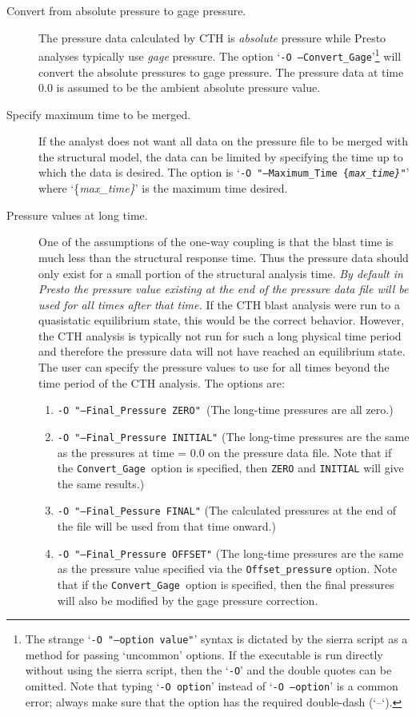 \documentclass[11pt,twoside]{article}
\newcommand{\cmd}[1]
   {\mbox{\tt #1}\null}
\newcommand{\param}[1]
   {\mbox{\{\em #1\}}\null}
\begin{document}
\begin{description}
\item [Convert from absolute pressure to gage pressure.]  The pressure data
calculated by CTH is \textit{absolute} pressure while Presto analyses
typically use \textit{gage} pressure.  The option `\cmd{{}-O
{--}Convert\_Gage}'\footnote{ The strange `\cmd{{-}O "{--}option
value"}' syntax is dictated by the sierra script as a method for
passing `uncommon' options.  If the executable is run directly without
using the sierra script, then the `\cmd{{-}O}' and the double quotes
can be omitted.  Note that typing `\cmd{{}-O option}' instead of
`\cmd{{}-O {--}option}' is a common error; always make sure that the
option has the required double-dash (`{}--`).} will convert the
absolute pressures to gage pressure.  The pressure data at time 0.0 is
assumed to be the ambient absolute pressure value.
\item [Specify maximum time to be merged.]  If the analyst does not want all
data on the pressure file to be merged with the structural model, the
data can be limited by specifying the time up to which the data is
desired.  The option is `\cmd{{-}O "{--}Maximum\_Time
\param{max\_time}"}' where `\param{max\_time}' is the maximum time
desired.
\item [Pressure values at long time.]  One of the assumptions of the one{}-way
coupling is that the blast time is much less than the structural
response time.  Thus the pressure data should only exist for a small
portion of the structural analysis time.  \textit{By default in Presto
the pressure value existing at the end of the pressure data file will
be used for all times after that time. } If the CTH blast analysis
were run to a quasistatic equilibrium state, this would be the correct
behavior.  However, the CTH analysis is typically not run for such a
long physical time period and therefore the pressure data will not have
reached an equilibrium state.  The user can specify the pressure
values to use for all times beyond the time period of the CTH analysis.
The options are:

\begin{enumerate}
\item \cmd{{-}O "{--}Final\_Pressure ZERO"  }(The long{}-time
pressures are all zero.)
\item \cmd{{-}O "{--}Final\_Pressure INITIAL"}  (The long{}-time
pressures are the same as the pressures at time = 0.0 on the pressure
data file.  Note that if the \cmd{Convert\_Gage }option is
specified, then \cmd{ZERO} and \cmd{INITIAL} will give the same
results.)
\item \cmd{{-}O "{--}Final\_Pessure FINAL"}  (The calculated
pressures at the end of the file will be used from that time onward.)
\item \cmd{{-}O "{--}Final\_Pressure OFFSET"}  (The long{}-time
pressures are the same as the pressure value specified via the
\cmd{Offset\_pressure} option. Note that if the \cmd{Convert\_Gage }option is
specified, then the final pressures will also be modified by the gage
pressure correction.
\end{enumerate}


\end{description}
\end{document}
